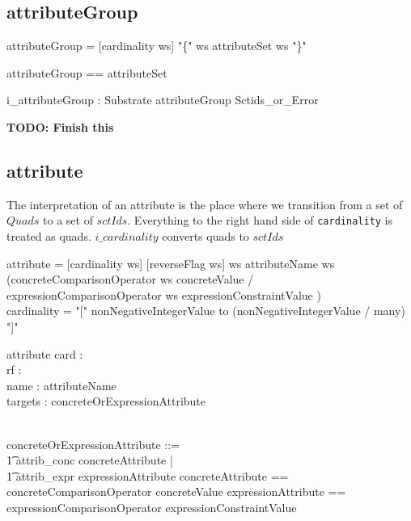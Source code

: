 \documentclass{article}
\def\spec#1{{\tt #1}}
\def\bnf#1{{\scriptsize {{#1}} }}
\begin{document}
\subsection{attributeGroup}
\begin{framed}
\noindent
\bnf{attributeGroup = [cardinality ws] "\{" ws attributeSet ws "\}"}
\end{framed}

\begin{zed}
attributeGroup == \optional[cardinality] \cross attributeSet
\end{zed}

\begin{gendef}
   i\_attributeGroup : Substrate \fun attributeGroup \fun Sctids\_or\_Error
\end{gendef}
\textbf{TODO: Finish this}


\subsection{attribute}
The interpretation of an attribute is the place where we transition from a set of $Quads$ to a set of $sctIds$.  Everything to
the right hand side of \spec{cardinality} is treated as quads.  $i\_cardinality$ converts quads to $sctIds$

\begin{framed}
\noindent
\bnf{attribute = [cardinality ws] [reverseFlag ws] ws attributeName ws \\
	(concreteComparisonOperator ws concreteValue / \\
	expressionComparisonOperator ws expressionConstraintValue )} \\
\bnf{cardinality = "[" nonNegativeIntegerValue to (nonNegativeIntegerValue / many) "]" }
\end{framed}

\begin{schema}{attribute}
   card : \optional[cardinality] \\
   rf : \optional[reverseFlag] \\
   name : attributeName \\
   targets : concreteOrExpressionAttribute
\end{schema}

\begin{zed}
[reverseFlag] \\
concreteOrExpressionAttribute ::= \\
\t1 attrib\_conc \ldata concreteAttribute \rdata | \\
\t1 attrib\_expr \ldata expressionAttribute \rdata
\also
concreteAttribute == concreteComparisonOperator \cross concreteValue
\also
expressionAttribute == expressionComparisonOperator \cross expressionConstraintValue
\end{zed}
\end{document}
